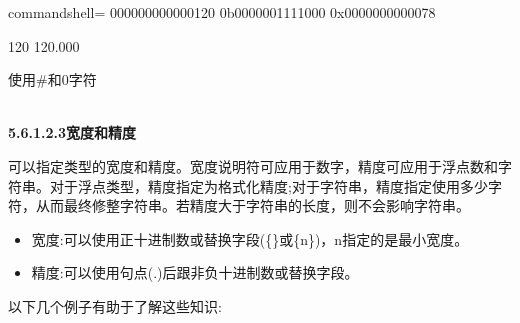 \begin{tcblisting}{commandshell={}}
000000000000120
0b0000001111000
0x0000000000078

120
120.000
\end{tcblisting}

\begin{center}
使用\#和0字符
\end{center}

\hspace*{\fill} \\ %
\noindent
\textbf{5.6.1.2.3\hspace{0.2cm}宽度和精度}

可以指定类型的宽度和精度。宽度说明符可应用于数字，精度可应用于浮点数和字符串。对于浮点类型，精度指定为格式化精度;对于字符串，精度指定使用多少字符，从而最终修整字符串。若精度大于字符串的长度，则不会影响字符串。

\begin{itemize}
\item 
宽度:可以使用正十进制数或替换字段(\{\}或\{n\})，n指定的是最小宽度。

\item 
精度:可以使用句点(.)后跟非负十进制数或替换字段。
\end{itemize}

以下几个例子有助于了解这些知识:

